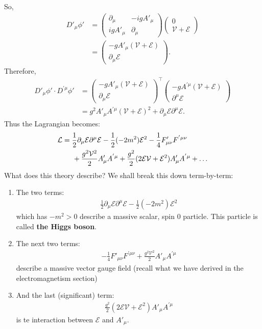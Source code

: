 \documentclass[a4paper,11pt]{article}
\numberwithin{equation}{section}
\theoremstyle{definition}
\newcommand{\p}{\partial}
\newcommand{\lag}{\mathcal{L}}
\newcommand{\E}{\mathcal{E}}
\begin{document}
So,
\begin{align}
D'_\mu \phi' &= \begin{pmatrix}
\p_\mu & -igA'_\mu\\
igA'_\mu &  \p_\mu
\end{pmatrix}\begin{pmatrix}
0 \\ \mathcal{V} + \mathcal{E} \end{pmatrix}\\ &= \begin{pmatrix}
-gA'_\mu (\mathcal{V} + \mathcal{E})\\
\p_\mu \mathcal{E}
\end{pmatrix}.
\end{align}
Therefore,
\begin{align}
D'_\mu \phi' \cdot D^{'\mu}\phi' &= \begin{pmatrix}
-gA'_\mu (\mathcal{V} + \mathcal{E})\\
\p_\mu \mathcal{E}
\end{pmatrix}^\top\begin{pmatrix}
-gA^{'\mu} (\mathcal{V} + \mathcal{E})\\
\p^\mu \mathcal{E}
\end{pmatrix}\\
 &= g^2 A'_\mu A^{'\mu}(\mathcal{V} + \mathcal{E})^2 + \p_\mu \mathcal{E} \p^\mu \mathcal{E}.
\end{align}
Thus the Lagrangian becomes:
\begin{align}
\lag &= \frac{1}{2}\p_\mu\E\p^\mu\E - \frac{1}{2}(-2m^2)\mathcal{E}^2 - \frac{1}{4}F'_{\mu\nu}F^{'\mu\nu}\\ 
&\hspace{0.5cm}+ \frac{g^2\mathcal{V}^2}{2}A'_\mu A^{'\mu} + \frac{g^2}{2}(2\mathcal{E}\mathcal{V} + \mathcal{E}^2)A'_\mu A^{'\mu} + \dots 
\end{align}
What does this theory describe? We shall break this down term-by-term:
\begin{enumerate}
	\item The two terms:
	\begin{align}
	\frac{1}{2}\p_\mu\E\p^\mu\E - \frac{1}{2}(-2m^2)\mathcal{E}^2
	\end{align}
	which has $-m^2 > 0$ describe a massive scalar, spin 0 particle. This particle is called \textbf{the Higgs boson}. \\
	
	\item The next two terms:
	\begin{align}
	- \frac{1}{4}F'_{\mu\nu}F^{'\mu\nu} + \frac{g^2\mathcal{V}^2}{2}A'_\mu A^{'\mu}
	\end{align}
	describe a massive vector gauge field (recall what we have derived in the electromagnetism section)\\
	
	\item And the last (significant) term:
	\begin{align}
	\frac{g^2}{2}(2\mathcal{E}\mathcal{V} + \mathcal{E}^2)A'_\mu A^{'\mu}
	\end{align}
	is te interaction between $\mathcal{E}$ and $A'_\mu$.
\end{enumerate}
\end{document}
